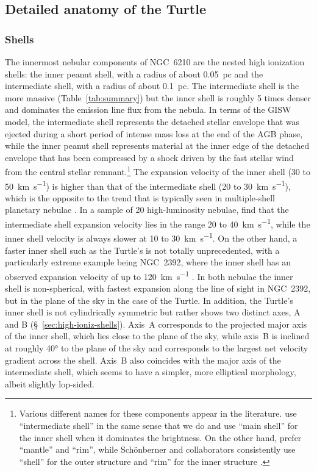 \documentclass[useAMS, usenatbib]{mnras}
\begin{document}
\subsection{Detailed anatomy of the Turtle}
\label{sec:anatomy}

\subsubsection{Shells}
\label{sec:shells}


The innermost nebular components of NGC~6210 are the nested high ionization shells:
the inner peanut shell, with a radius of about \SI{0.05}{pc}
and the intermediate shell, with a radius of about \SI{0.1}{pc}.
The intermediate shell is the more massive (Table~\ref{tab:summary})
but the inner shell is roughly 5 times denser and dominates the emission line flux from the nebula.
In terms of the GISW model, the intermediate shell represents the detached stellar envelope
that was ejected during a short period of intense mass loss at the end of the AGB phase,
while the inner peanut shell represents material at the inner edge of the detached envelope
that has been compressed by a shock driven by the fast stellar wind from the central stellar remnant.\footnote{%
  Various different names for these components appear in the literature.
  \citet{Villaver:2002a} use ``intermediate shell'' in the same sense that we do
  and use ``main shell'' for the inner shell when it dominates the brightness.
  On the other hand, \citet{Balick:2002a} prefer ``mantle'' and ``rim'',
  while Schönberner and collaborators consistently use ``shell'' for the outer structure
  and ``rim'' for the inner structure
  \citep[e.g.,][]{Perinotto:2004a, Schonberner:2014a, Schonberner:2018a}.
}
The expansion velocity of the inner shell (\num{30} to \SI{50}{km.s^{-1}})
is higher than that of the intermediate shell (\num{20} to \SI{30}{km.s^{-1}}),
which is the opposite to the trend that is typically seen in multiple-shell planetary nebulae \citep{Corradi:2007a}.
In a sample of 20 high-luminosity nebulae, \citet{Schonberner:2014a} find that the intermediate shell expansion velocity lies in the range \num{20} to \SI{40}{km.s^{-1}},
while the inner shell velocity is always slower at \num{10} to \SI{30}{km.s^{-1}}.
On the other hand, a faster inner shell such as the Turtle's
is not totally unprecedented,
with a particularly extreme example being NGC~2392,
where the inner shell has an observed expansion velocity of up to \SI{120}{km.s^{-1}} \citep{Garcia-Diaz:2012a}.
In both nebulae the inner shell is non-spherical,
with fastest expansion along the line of sight in NGC~2392,
but in the plane of the sky in the case of the Turtle.
In addition, the Turtle's inner shell is not cylindrically symmetric but rather shows two distinct axes, A and B (\S~\ref{sec:high-ioniz-shells}).
Axis~A corresponds to the projected major axis of the inner shell,
which lies close to the plane of the sky,
while axis~B is inclined at roughly \ang{40} to the plane of the sky
and corresponds to the largest net velocity gradient across the shell.
Axis~B also coincides with the major axis of the intermediate shell,
which seems to have a simpler, more elliptical morphology,
albeit slightly lop-sided.
\end{document}
